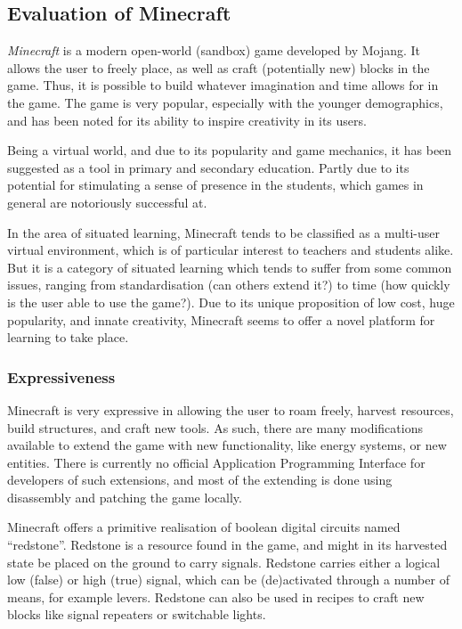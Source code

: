 \subsection{Evaluation of Minecraft}

\textit{Minecraft} is a modern open-world (sandbox) game developed by Mojang. It
allows the user to freely place, as well as craft (potentially new) blocks in
the game. Thus, it is possible to build whatever imagination and time allows for
in the game. The game is very popular, especially with the younger demographics,
and has been noted for its ability to inspire creativity in its
users.\cite{minecraftign}

Being a virtual world, and due to its popularity and game mechanics, it has been
suggested as a tool in primary and secondary education. Partly due to its 
potential for stimulating a sense of presence in the 
students\cite{coudrayminecraft}, which games in general are notoriously 
successful at.

In the area of situated learning, Minecraft tends to be classified as a
multi-user virtual environment, which is of particular interest to teachers
and students alike. But it is a category of situated learning which tends to 
suffer from some common issues, ranging from standardisation (can others 
extend it?) to time (how quickly is the user able to use the 
game?)\cite{dawley2014situated}. Due to its unique proposition of low cost, 
huge popularity, and innate creativity, Minecraft seems to offer a novel 
platform for learning to take place\cite{coudrayminecraft}.

\subsubsection{Expressiveness}

Minecraft is very expressive in allowing the user to roam freely, harvest 
resources, build structures, and craft new tools. As such, there are many 
modifications available to extend the game with new functionality, like energy 
systems, or new entities. There is currently no official Application 
Programming Interface for developers of such extensions, and most of the 
extending is done using disassembly and patching the game locally.

Minecraft offers a primitive realisation of boolean digital circuits named
``redstone''. Redstone is a resource found in the game, and might in its 
harvested
state be placed on the ground to carry signals. Redstone carries either a
logical low (false) or high (true) signal, which can be (de)activated through 
a number of means, for example levers. Redstone can also be used in recipes to
craft new blocks like signal repeaters or switchable lights.

